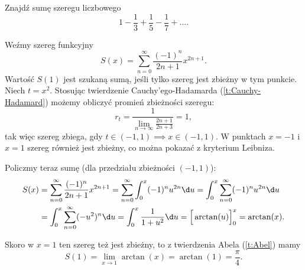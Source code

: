 \begin{example}
    Znajdź sumę szeregu liczbowego
    \[ 1 - \frac{1}{3} + \frac{1}{5} - \frac{1}{7} + \ldots. \]
\end{example}
\begin{solution}
    Weźmy szereg funkcyjny
    \[ S(x) = \sum_{n=0}^\infty \frac{(-1)^n}{2n+1}x^{2n+1}. \]
    Wartość $S(1)$ jest szukaną sumą, jeśli tylko szereg jest zbieżny w tym punkcie. Niech $t = x^2$. Stosując twierdzenie Cauchy'ego-Hadamarda (\ref{t:Cauchy-Hadamard}) możemy obliczyć promień zbieżności szeregu:
    \[ r_t = \frac{1}{\lim\limits_{n\to\infty}\frac{2n+1}{2n+3}} = 1, \]
    tak więc szereg zbiega, gdy $t \in (-1, 1) \implies x \in (-1, 1)$. W punktach $x = -1$ i $x = 1$ szereg również jest zbieżny, co można pokazać z kryterium Leibniza.

    Policzmy teraz sumę (dla przedziału zbieżności $(-1, 1)$):
    \begin{align*}
        S(x) &= \sum_{n=0}^\infty \frac{(-1)^n}{2n+1}x^{2n+1} = \sum_{n=0}^\infty\int_0^x (-1)^n u^{2n} \d u = \int_0^x\sum_{n=0}^\infty (-1)^n u^{2n} \d u \\
        &= \int_0^x\sum_{n=0}^\infty (-u^2)^n \d u = \int_0^x \frac{1}{1 + u^2} \d u = \Big[\arctan(u)\Big]_0^x = \arctan(x).
    \end{align*}

    Skoro w $x = 1$ ten szereg też jest zbieżny, to z twierdzenia Abela (\ref{t:Abel}) mamy
    \[ S(1) = \lim_{x\to 1}\arctan(x) = \arctan(1) = \frac{\pi}{4}. \]
\end{solution}